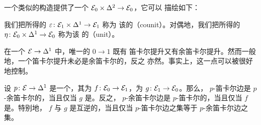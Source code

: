 一个类似的构造提供了一个\trFunctor{} $\mathcal{E}_0 \times \Delta^2 \to \mathcal{E}_0$，它可以
描绘如下：
\begin{center}
\end{center}

\begin{definition}\label{def:unit-counit}
我们把所得的\trFunctor{} $\varepsilon\colon \mathcal{E}_1 \times \Delta^1 \to \mathcal{E}_1$ 称为
该\trAdjunction{}的\emph{\trCounit{}}（counit）。对偶地，我们把所得的%
\trFunctor{} $\eta\colon \mathcal{E}_0 \times \Delta^1 \to \mathcal{E}_0$ 称为该\trAdjunction{}%
的\emph{\trUnit{}}（unit）。
\end{definition}

\begin{remark}\label{rem:cartesian-lift-not-cocartesian}
在一个\trAdjunction{} $\mathcal{E} \to \Delta^1$ 中，唯一的\trMorphism{} $0 \to 1$ 既有
笛卡尔提升又有余笛卡尔提升。然而一般地，一个笛卡尔提升未必是余笛卡尔的，反之
亦然。事实上，这一点可以被很好地控制。
\end{remark}

\begin{proposition}\label{prop:cart-cocart-fully-faithful}
设 $p\colon \mathcal{E} \to \Delta^1$ 是一个\trAdjunction{}，其\trLeftAdjoint{}为
$f\colon \mathcal{E}_0 \to \mathcal{E}_1$，\trRightAdjoint{}为 $g\colon \mathcal{E}_1 \to \mathcal{E}_0$。那么，
$p$-笛卡尔边是 $p$-余笛卡尔的，当且仅当 $g$ 是\trFullyFaithful{}。反之，
$p$-余笛卡尔边是 $p$-笛卡尔的，当且仅当 $f$ 是\trFullyFaithful{}。特别地，
$f$ 与 $g$ 是互逆的\trEquivalence{}，当且仅当 $p$-笛卡尔边之集等于
$p$-余笛卡尔边之集。
\end{proposition}

